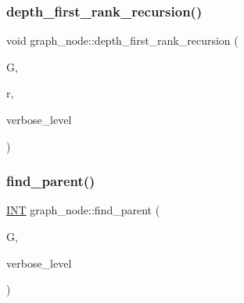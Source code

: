\mbox{\label{classgraph__node_a491dc88828723c779c98510c61428df0}} 
\subsubsection{\texorpdfstring{depth\+\_\+first\+\_\+rank\+\_\+recursion()}{depth\_first\_rank\_recursion()}}
{\footnotesize\ttfamily void graph\+\_\+node\+::depth\+\_\+first\+\_\+rank\+\_\+recursion (\begin{DoxyParamCaption}\item[{\mbox{\hyperlink{classlayered__graph}{layered\+\_\+graph}} $\ast$}]{G,  }\item[{\mbox{\hyperlink{galois_8h_a09fddde158a3a20bd2dcadb609de11dc}{I\+NT}} \&}]{r,  }\item[{\mbox{\hyperlink{galois_8h_a09fddde158a3a20bd2dcadb609de11dc}{I\+NT}}}]{verbose\+\_\+level }\end{DoxyParamCaption})}

\mbox{\label{classgraph__node_aaf92860d56470bb8dd641726a30f9cb3}} 
\subsubsection{\texorpdfstring{find\+\_\+parent()}{find\_parent()}}
{\footnotesize\ttfamily \mbox{\hyperlink{galois_8h_a09fddde158a3a20bd2dcadb609de11dc}{I\+NT}} graph\+\_\+node\+::find\+\_\+parent (\begin{DoxyParamCaption}\item[{\mbox{\hyperlink{classlayered__graph}{layered\+\_\+graph}} $\ast$}]{G,  }\item[{\mbox{\hyperlink{galois_8h_a09fddde158a3a20bd2dcadb609de11dc}{I\+NT}}}]{verbose\+\_\+level }\end{DoxyParamCaption})}

\mbox{\label{classgraph__node_a7ac4fec7e174284d17f9d43e2ab5f5b1}} 
